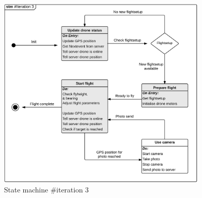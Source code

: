 \vspace{-0.2cm}
\begin{figure}[H]
	\centering
	\includegraphics[width=0.9\textwidth]{Billeder/statemachine/State_iteration3.png}
	\caption{State machine \#iteration 3}
	\label{fig:Statemachine_iteration3}
\end{figure}

